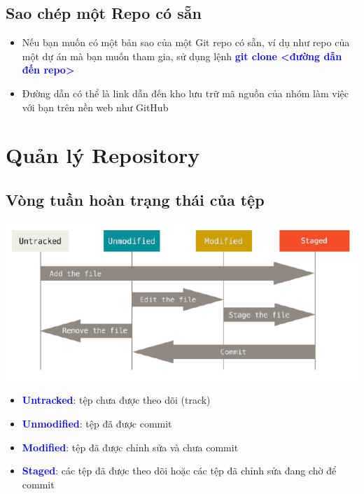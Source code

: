 \documentclass[12pt,a4paper]{report}
\begin{document}
\subsection{Sao chép một Repo có sẵn}
\begin{itemize}
\item Nếu bạn muốn có một bản sao của một Git repo có sẵn, ví dụ như repo của một dự án mà bạn muốn tham gia, sử dụng lệnh \textcolor{blue}{\bf git clone <đường dẫn đến repo>}
\item Đường dẫn có thể là link dẫn đến kho lưu trữ mã nguồn của nhóm làm việc với bạn trên nền web như GitHub
\end{itemize}
\section{Quản lý Repository}

\subsection{Vòng tuần hoàn trạng thái của tệp}

	\includegraphics[width=0.8\linewidth]{screenshot006}
	
	\label{fig:screenshot006}
\begin{itemize}
\item \textcolor{blue}{\bf Untracked}: tệp chưa được theo dõi (track)
\item \textcolor{blue}{\bf Unmodified}: tệp đã được commit\vskip 0.4cm
\item \textcolor{blue}{\bf Modified}: tệp đã được chỉnh sửa và chưa commit
\item \textcolor{blue}{\bf Staged}: các tệp đã được theo dõi hoặc các tệp đã chỉnh sửa đang chờ để commit
\end{itemize}
\end{document}
